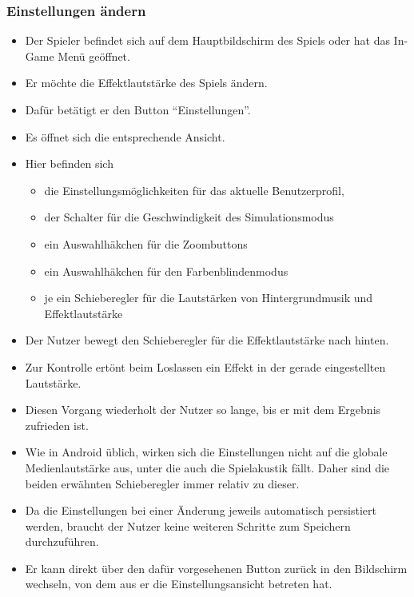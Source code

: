 \subsubsection{Einstellungen ändern}
\begin{itemize}
\item Der Spieler befindet sich auf dem Hauptbildschirm des Spiels oder hat das In-Game Menü 
geöffnet.
\item Er möchte die Effektlautstärke des Spiels ändern.
\item Dafür betätigt er den Button "`Einstellungen"'.
\item Es öffnet sich die entsprechende Ansicht.
\item Hier befinden sich
	\begin{itemize}
	\item die Einstellungsmöglichkeiten für das aktuelle Benutzerprofil, 
	\item der Schalter für die Geschwindigkeit des Simulationsmodus
	\item ein Auswahlhäkchen für die Zoombuttons
	\item ein Auswahlhäkchen für den Farbenblindenmodus
	\item je ein Schieberegler für die Lautstärken von Hintergrundmusik und Effektlautstärke
	\end{itemize}
\item Der Nutzer bewegt den Schieberegler für die Effektlautstärke nach hinten.
\item Zur Kontrolle ertönt beim Loslassen ein Effekt in der
gerade eingestellten Lautstärke.
\item Diesen Vorgang wiederholt der Nutzer so lange, bis er mit dem Ergebnis zufrieden ist.
\item Wie in Android üblich, wirken sich die Einstellungen nicht auf die globale Medienlautstärke
aus, unter die auch die Spielakustik fällt. Daher sind die beiden erwähnten Schieberegler immer relativ zu dieser. 
\item Da die Einstellungen bei einer Änderung jeweils automatisch persistiert werden, braucht der
Nutzer keine weiteren Schritte zum Speichern durchzuführen.
\item Er kann direkt über den dafür vorgesehenen Button zurück in den Bildschirm
wechseln, von dem aus er die Einstellungsansicht betreten hat.
\end{itemize}
